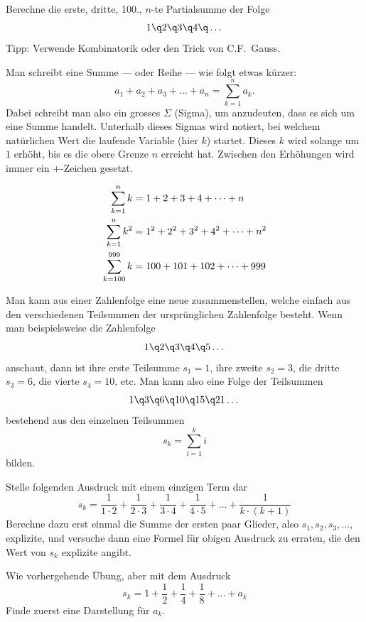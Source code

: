 \documentclass[%
11pt,%
twoside,%
titlepage,%
german,%
headsepline%
]{scrartcl}
\begin{document}
\begin{ueb}
Berechne die erste, dritte, 100., $n$-te Partialsumme der Folge
$$1\q2\q3\q4\q\dots$$
Tipp: Verwende Kombinatorik oder den Trick von C.F.~Gauss.
\end{ueb}

\begin{bem}
Man schreibt eine Summe --- oder Reihe --- wie folgt etwas k\"urzer:
$$a_1+a_2+a_3+\dots+a_n = \sum_{k=1}^{n}a_k.$$
Dabei schreibt man also ein grosses $\Sigma$ (Sigma), um anzudeuten, dass es sich um eine Summe handelt. Unterhalb dieses Sigmas wird notiert, bei welchem nat\"urlichen Wert die laufende Variable (hier $k$) startet. Dieses $k$ wird solange um $1$ erh\"oht, bis es die obere Grenze $n$ erreicht hat. Zwischen den Erh\"ohungen wird immer ein $+$-Zeichen gesetzt.
\end{bem}
\begin{bsps}
\begin{align}
\notag
\sum_{k=1}^{n}k &=1+2+3+4+\dots +n\\ \notag
\sum_{k=1}^{n}k^2 &=1^2+2^2+3^2+4^2+\dots+n^2\\ \notag
\sum_{k=100}^{999}k &=100+101+102+\dots+999
\end{align}
\end{bsps}
\begin{bem}

Man kann aus einer Zahlenfolge eine neue zusammenstellen, welche einfach aus den verschiedenen Teilsummen der urspr\"unglichen Zahlenfolge besteht. Wenn man beispielsweise die Zahlenfolge
$$1\q2\q3\q4\q5\dots$$
anschaut, dann ist ihre erste Teilsumme $s_1=1$, ihre zweite $s_2=3$, die dritte $s_3=6$, die vierte $s_4=10$, etc. Man kann also eine Folge der Teilsummen
$$1\q3\q6\q10\q15\q21\dots$$
bestehend aus den einzelnen Teilsummen
$$s_k=\sum_{i=1}^{k}i$$
bilden.
\end{bem}

\begin{ueb}[Folgeprodukt]
Stelle folgenden Ausdruck mit einem einzigen Term dar
$$s_k=\frac{1}{1\cdot2}+\frac{1}{2\cdot3}+\frac{1}{3\cdot4}+\frac{1}{4\cdot5}+\dots+\frac{1}{k\cdot(k+1)}$$
Berechne dazu erst einmal die Summe der ersten paar Glieder, also $s_1, s_2, s_3,\dots$, explizite, und versuche dann eine Formel f\"ur obigen Ausdruck zu erraten, die den Wert von $s_k$ explizite angibt.
\end{ueb}

\begin{ueb}
Wie vorhergehende Übung, aber mit dem Ausdruck
$$s_k=1+\frac{1}{2}+\frac{1}{4}+\frac{1}{8}+\dots+a_k$$
Finde zuerst eine Darstellung f\"ur $a_k$.
\end{ueb}
\end{document}
